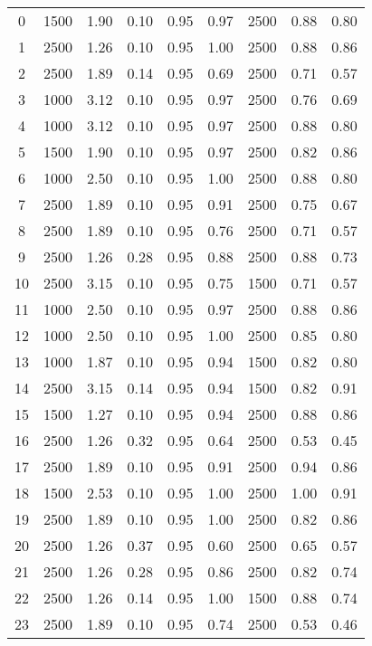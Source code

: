 \begin{longtable}[c]{ccccccccc}
0  &  1500 &  1.90 &  0.10 &  0.95 &  0.97 &  2500 &  0.88 &  0.80 \\
1  &  2500 &  1.26 &  0.10 &  0.95 &  1.00 &  2500 &  0.88 &  0.86 \\
2  &  2500 &  1.89 &  0.14 &  0.95 &  0.69 &  2500 &  0.71 &  0.57 \\
3  &  1000 &  3.12 &  0.10 &  0.95 &  0.97 &  2500 &  0.76 &  0.69 \\
4  &  1000 &  3.12 &  0.10 &  0.95 &  0.97 &  2500 &  0.88 &  0.80 \\
5  &  1500 &  1.90 &  0.10 &  0.95 &  0.97 &  2500 &  0.82 &  0.86 \\
6  &  1000 &  2.50 &  0.10 &  0.95 &  1.00 &  2500 &  0.88 &  0.80 \\
7  &  2500 &  1.89 &  0.10 &  0.95 &  0.91 &  2500 &  0.75 &  0.67 \\
8  &  2500 &  1.89 &  0.10 &  0.95 &  0.76 &  2500 &  0.71 &  0.57 \\
9  &  2500 &  1.26 &  0.28 &  0.95 &  0.88 &  2500 &  0.88 &  0.73 \\
10 &  2500 &  3.15 &  0.10 &  0.95 &  0.75 &  1500 &  0.71 &  0.57 \\
11 &  1000 &  2.50 &  0.10 &  0.95 &  0.97 &  2500 &  0.88 &  0.86 \\
12 &  1000 &  2.50 &  0.10 &  0.95 &  1.00 &  2500 &  0.85 &  0.80 \\
13 &  1000 &  1.87 &  0.10 &  0.95 &  0.94 &  1500 &  0.82 &  0.80 \\
14 &  2500 &  3.15 &  0.14 &  0.95 &  0.94 &  1500 &  0.82 &  0.91 \\
15 &  1500 &  1.27 &  0.10 &  0.95 &  0.94 &  2500 &  0.88 &  0.86 \\
16 &  2500 &  1.26 &  0.32 &  0.95 &  0.64 &  2500 &  0.53 &  0.45 \\
17 &  2500 &  1.89 &  0.10 &  0.95 &  0.91 &  2500 &  0.94 &  0.86 \\
18 &  1500 &  2.53 &  0.10 &  0.95 &  1.00 &  2500 &  1.00 &  0.91 \\
19 &  2500 &  1.89 &  0.10 &  0.95 &  1.00 &  2500 &  0.82 &  0.86 \\
20 &  2500 &  1.26 &  0.37 &  0.95 &  0.60 &  2500 &  0.65 &  0.57 \\
21 &  2500 &  1.26 &  0.28 &  0.95 &  0.86 &  2500 &  0.82 &  0.74 \\
22 &  2500 &  1.26 &  0.14 &  0.95 &  1.00 &  1500 &  0.88 &  0.74 \\
23 &  2500 &  1.89 &  0.10 &  0.95 &  0.74 &  2500 &  0.53 &  0.46 \\

\end{longtable}
